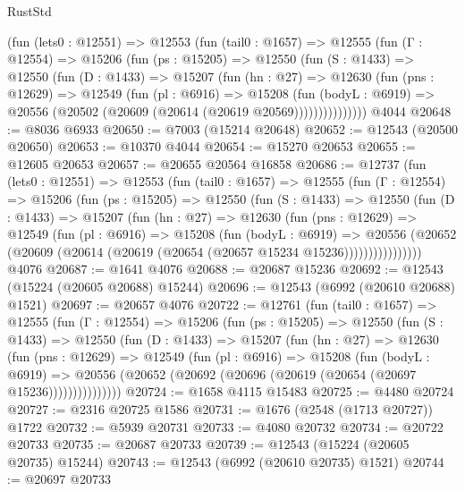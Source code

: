 \begin{lexlean}{RustStd}
\begin{coremodule}
      (fun (lets0 : @12551) =>
      @12553
        (fun (tail0 : @1657) =>
        @12555
          (fun (Γ : @12554) =>
          @15206
            (fun (ps : @15205) =>
            @12550
              (fun (S : @1433) =>
              @12550
                (fun (D : @1433) =>
                @15207
                  (fun (hn : @27) =>
                  @12630
                    (fun (pns : @12629) =>
                    @12549
                      (fun (pl : @6916) =>
                      @15208
                        (fun (bodyL : @6919) =>
                        @20556 (@20502 (@20609 (@20614 (@20619 @20569)))))))))))))))
    @4044
@20648 := @8036 @6933
@20650 := @7003 (@15214 @20648)
@20652 := @12543 (@20500 @20650)
@20653 := @10370 @4044
@20654 := @15270 @20653
@20655 := @12605 @20653
@20657 := @20655 @20564 @16858
@20686 := @12737
    (fun (lets0 : @12551) =>
    @12553
      (fun (tail0 : @1657) =>
      @12555
        (fun (Γ : @12554) =>
        @15206
          (fun (ps : @15205) =>
          @12550
            (fun (S : @1433) =>
            @12550
              (fun (D : @1433) =>
              @15207
                (fun (hn : @27) =>
                @12630
                  (fun (pns : @12629) =>
                  @12549
                    (fun (pl : @6916) =>
                    @15208
                      (fun (bodyL : @6919) =>
                      @20556
                        (@20652
                          (@20609 (@20614 (@20619 (@20654 (@20657 @15234 @15236))))))))))))))))
    @4076
@20687 := @1641 @4076
@20688 := @20687 @15236
@20692 := @12543 (@15224 (@20605 @20688) @15244)
@20696 := @12543 (@6992 (@20610 @20688) @1521)
@20697 := @20657 @4076
@20722 := @12761
    (fun (tail0 : @1657) =>
    @12555
      (fun (Γ : @12554) =>
      @15206
        (fun (ps : @15205) =>
        @12550
          (fun (S : @1433) =>
          @12550
            (fun (D : @1433) =>
            @15207
              (fun (hn : @27) =>
              @12630
                (fun (pns : @12629) =>
                @12549
                  (fun (pl : @6916) =>
                  @15208
                    (fun (bodyL : @6919) =>
                    @20556 (@20652 (@20692 (@20696 (@20619 (@20654 (@20697 @15236)))))))))))))))
@20724 := @1658 @4115 @15483
@20725 := @4480 @20724
@20727 := @2316 @20725 @1586
@20731 := @1676 (@2548 (@1713 @20727)) @1722
@20732 := @5939 @20731
@20733 := @4080 @20732
@20734 := @20722 @20733
@20735 := @20687 @20733
@20739 := @12543 (@15224 (@20605 @20735) @15244)
@20743 := @12543 (@6992 (@20610 @20735) @1521)
@20744 := @20697 @20733

\end{coremodule}
\end{lexlean}
